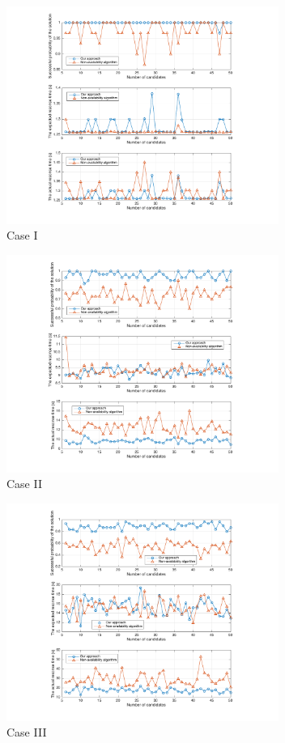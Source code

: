\documentclass[10pt,journal,compsoc]{IEEEtran}
\begin{document}
\begin{figure}[!t]
\centering
\includegraphics[width=3.5in]{./img/Task-6.pdf}
\caption{Case I}
\label{fig_DAG}
\end{figure}


\begin{figure}[!t]
\centering
\includegraphics[width=3.5in]{./img/Task-12.pdf}
\caption{Case II}
\label{fig_DAG}
\end{figure}

\begin{figure}[!t]
\centering
\includegraphics[width=3.5in]{./img/Task-24.pdf}
\caption{Case III}
\label{fig_DAG}
\end{figure}
\end{document}
